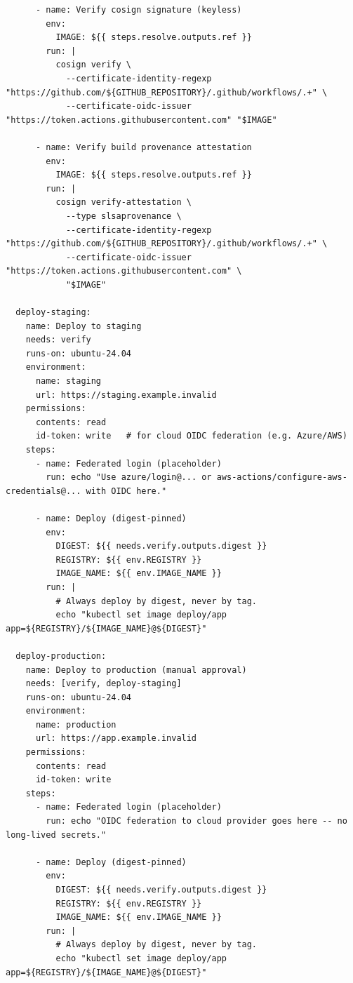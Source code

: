 \documentclass[12pt, a4paper]{scrartcl}
\begin{document}
\begin{lstlisting}
      - name: Verify cosign signature (keyless)
        env:
          IMAGE: ${{ steps.resolve.outputs.ref }}
        run: |
          cosign verify \
            --certificate-identity-regexp "https://github.com/${GITHUB_REPOSITORY}/.github/workflows/.+" \
            --certificate-oidc-issuer "https://token.actions.githubusercontent.com" "$IMAGE"

      - name: Verify build provenance attestation
        env:
          IMAGE: ${{ steps.resolve.outputs.ref }}
        run: |
          cosign verify-attestation \
            --type slsaprovenance \
            --certificate-identity-regexp "https://github.com/${GITHUB_REPOSITORY}/.github/workflows/.+" \
            --certificate-oidc-issuer "https://token.actions.githubusercontent.com" \
            "$IMAGE"

  deploy-staging:
    name: Deploy to staging
    needs: verify
    runs-on: ubuntu-24.04
    environment:
      name: staging
      url: https://staging.example.invalid
    permissions:
      contents: read
      id-token: write   # for cloud OIDC federation (e.g. Azure/AWS)
    steps:
      - name: Federated login (placeholder)
        run: echo "Use azure/login@... or aws-actions/configure-aws-credentials@... with OIDC here."

      - name: Deploy (digest-pinned)
        env:
          DIGEST: ${{ needs.verify.outputs.digest }}
          REGISTRY: ${{ env.REGISTRY }}
          IMAGE_NAME: ${{ env.IMAGE_NAME }}
        run: |
          # Always deploy by digest, never by tag.
          echo "kubectl set image deploy/app app=${REGISTRY}/${IMAGE_NAME}@${DIGEST}"

  deploy-production:
    name: Deploy to production (manual approval)
    needs: [verify, deploy-staging]
    runs-on: ubuntu-24.04
    environment:
      name: production
      url: https://app.example.invalid
    permissions:
      contents: read
      id-token: write
    steps:
      - name: Federated login (placeholder)
        run: echo "OIDC federation to cloud provider goes here -- no long-lived secrets."

      - name: Deploy (digest-pinned)
        env:
          DIGEST: ${{ needs.verify.outputs.digest }}
          REGISTRY: ${{ env.REGISTRY }}
          IMAGE_NAME: ${{ env.IMAGE_NAME }}
        run: |
          # Always deploy by digest, never by tag.
          echo "kubectl set image deploy/app app=${REGISTRY}/${IMAGE_NAME}@${DIGEST}"
\end{lstlisting}
\end{document}
